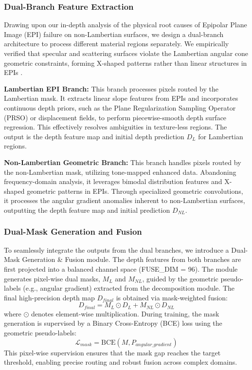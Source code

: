 \subsubsection{Dual-Branch Feature Extraction}
Drawing upon our in-depth analysis of the physical root causes of Epipolar Plane Image (EPI) failure on non-Lambertian surfaces, we design a dual-branch architecture to process different material regions separately. We empirically verified that specular and scattering surfaces violate the Lambertian angular cone geometric constraints, forming X-shaped patterns rather than linear structures in EPIs \cite{wang2024dualbranch}. 

\textbf{Lambertian EPI Branch:} This branch processes pixels routed by the Lambertian mask. It extracts linear slope features from EPIs and incorporates continuous depth priors, such as the Plane Regularization Sampling Operator (PRSO) or displacement fields, to perform piecewise-smooth depth surface regression. This effectively resolves ambiguities in texture-less regions. The output is the depth feature map and initial depth prediction $D_L$ for Lambertian regions.

\textbf{Non-Lambertian Geometric Branch:} This branch handles pixels routed by the non-Lambertian mask, utilizing tone-mapped enhanced data. Abandoning frequency-domain analysis, it leverages bimodal distribution features and X-shaped geometric patterns in EPIs. Through specialized geometric convolutions, it processes the angular gradient anomalies inherent to non-Lambertian surfaces, outputting the depth feature map and initial prediction $D_{NL}$.

\subsubsection{Dual-Mask Generation and Fusion}
To seamlessly integrate the outputs from the dual branches, we introduce a Dual-Mask Generation \& Fusion module. The depth features from both branches are first projected into a balanced channel space (FUSE\_DIM = 96). The module generates pixel-wise dual masks, $M_L$ and $M_{NL}$, guided by the geometric pseudo-labels (e.g., angular gradient) extracted from the decomposition module. The final high-precision depth map $D_{final}$ is obtained via mask-weighted fusion:
\begin{equation}
D_{final} = M_L \odot D_L + M_{NL} \odot D_{NL}
\label{eq:ch3_2}
\end{equation}
where $\odot$ denotes element-wise multiplication. During training, the mask generation is supervised by a Binary Cross-Entropy (BCE) loss using the geometric pseudo-labels:
\begin{equation}
\mathcal{L}_{mask} = \text{BCE}(M, P_{angular\_gradient})
\label{eq:ch3_3}
\end{equation}
This pixel-wise supervision ensures that the mask gap reaches the target threshold, enabling precise routing and robust fusion across complex domains.

